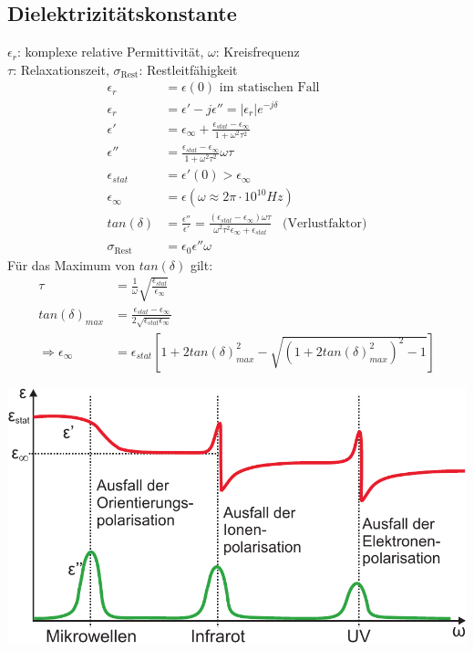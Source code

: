 \documentclass[a4paper,twocolumn,10pt]{article}
\begin{document}
\subsection{Dielektrizitätskonstante}
$\epsilon_r$: komplexe relative Permittivität, $\omega$: Kreisfrequenz\\
$\tau$: Relaxationszeit, $\sigma_{\text{Rest}}$: Restleitfähigkeit
\begin{equation*}
\begin{split}
\epsilon_r&=\epsilon(0)\text{ im statischen Fall}\\
\epsilon_r&=\epsilon'-j\epsilon''=|\epsilon_r|e^{-j\delta}\\
\epsilon'&=\epsilon_{\infty}+\frac{\epsilon_{stat}-\epsilon_{\infty}}{1+\omega^2\tau^2}\\
\epsilon''&=\frac{\epsilon_{stat}-\epsilon_{\infty}}{1+\omega^2\tau^2}\omega\tau\\
\epsilon_{stat}&=\epsilon'(0)>\epsilon_{\infty}\\
\epsilon_{\infty}&=\epsilon(\omega\approx 2\pi\cdot 10^{10}Hz)\\
tan(\delta)&=\frac{\epsilon''}{\epsilon'}=\frac{(\epsilon_{stat}-\epsilon_{\infty})\omega\tau}{\omega^2\tau^2\epsilon_{\infty}+\epsilon_{stat}}\;\;\;\text{(Verlustfaktor)}\\
\sigma_{\text{Rest}}&=\epsilon_0\epsilon''\omega
\end{split}
\end{equation*}
Für das Maximum von $tan(\delta)$ gilt:
\begin{equation*}
\begin{split}
\tau &=\frac{1}{\omega}\sqrt{\frac{\epsilon_{stat}}{\epsilon_{\infty}}}\\
tan(\delta)_{max}&=\frac{\epsilon_{stat}-\epsilon_{\infty}}{2\sqrt{\epsilon_{stat}\epsilon_{\infty}}}\\
\Rightarrow\epsilon_{\infty}&=\epsilon_{stat}\left[1+2tan(\delta)_{max}^2-\sqrt{(1+2tan(\delta)_{max}^2)^2-1}\right]
\end{split}
\end{equation*}
\begin{center}
\includegraphics[width=0.9\columnwidth]{Grafiken/Dielektrizitaetskonstante}
\end{center}
\end{document}
